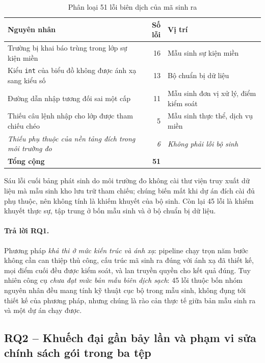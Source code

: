 \begin{table}[htbp]
\centering
\caption{Phân loại 51 lỗi biên dịch của mã sinh ra}
\label{tab:loi-bien-dich}
\small
\begin{tabularx}{\textwidth}{@{}Xrl@{}}
\toprule
\textbf{Nguyên nhân} & \textbf{Số lỗi} & \textbf{Vị trí} \\
\midrule
Trường bị khai báo trùng trong lớp sự kiện miền & 16 & Mẫu sinh sự kiện miền \\
Kiểu \texttt{int} của biểu đồ không được ánh xạ sang kiểu số & 13 & Bộ chuẩn bị dữ liệu \\
Đường dẫn nhập tương đối sai một cấp & 11 & Mẫu sinh đơn vị xử lý, điểm kiểm soát \\
Thiếu câu lệnh nhập cho lớp được tham chiếu chéo & 5 & Mẫu sinh thực thể, dịch vụ miền \\
\midrule
\textit{Thiếu phụ thuộc của nền tảng đích trong môi trường đo} & \textit{6} & \textit{Không phải lỗi bộ sinh} \\
\midrule
\textbf{Tổng cộng} & \textbf{51} & \\
\bottomrule
\end{tabularx}
\end{table}

Sáu lỗi cuối bảng phát sinh do môi trường đo không cài thư viện truy xuất dữ liệu mà mẫu sinh kho lưu trữ tham chiếu; chúng biến mất khi dự án đích cài đủ phụ thuộc, nên không tính là khiếm khuyết của bộ sinh. Còn lại 45 lỗi là khiếm khuyết thực sự, tập trung ở bốn mẫu sinh và ở bộ chuẩn bị dữ liệu.

\paragraph{Trả lời RQ1.}
Phương pháp \emph{khả thi ở mức kiến trúc và ánh xạ}: pipeline chạy trọn năm bước không cần can thiệp thủ công, cấu trúc mã sinh ra đúng với ánh xạ đã thiết kế, mọi điểm cuối đều được kiểm soát, và lan truyền quyền cho kết quả đúng. Tuy nhiên công cụ \emph{chưa đạt mức bản mẫu biên dịch sạch}: 45 lỗi thuộc bốn nhóm nguyên nhân đều mang tính kỹ thuật cục bộ trong mẫu sinh, không đụng tới thiết kế của phương pháp, nhưng chúng là rào cản thực tế giữa bản mẫu sinh ra và một dự án chạy được.

\subsection{RQ2 -- Khuếch đại gần bảy lần và phạm vi sửa chính sách gói trong ba tệp}

